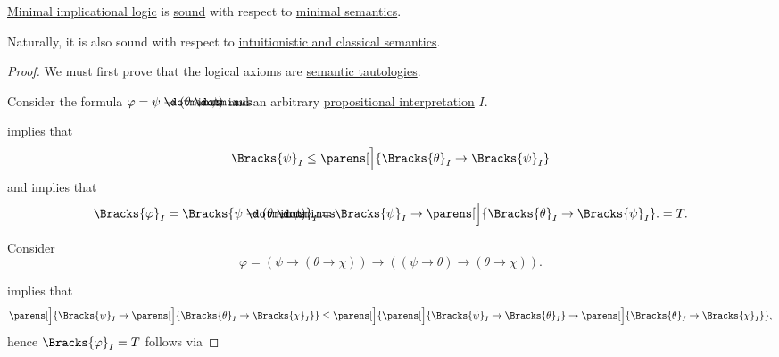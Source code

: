 \begin{theorem}\label{thm:implicational_logic_is_sound}
  \hyperref[def:minimal_implication_logic]{Minimal implicational logic} is \hyperref[def:logical_framework/soundness]{sound} with respect to \hyperref[def:minimal_propositional_semantics]{minimal semantics}.
\end{theorem}
\begin{comments}
  \item Naturally, it is also sound with respect to \hyperref[def:propositional_semantics]{intuitionistic and classical semantics}.
\end{comments}
\begin{proof}
   We must first prove that the logical axioms are \hyperref[def:propositional_tautology]{semantic tautologies}.

   Consider the formula \( \varphi = \psi \synimplies (\theta \synimplies \psi) \) and an arbitrary \hyperref[def:propositional_valuation]{propositional interpretation} \( I \).

   implies that
  \begin{equation*}
    \Bracks{\psi}_I \leq \parens[\Big]{ \Bracks{\theta}_I \rightarrow \Bracks{\psi}_I }
  \end{equation*}
  and  implies that
  \begin{equation*}
    \Bracks{\varphi}_I
    =
    \Bracks{\psi \synimplies (\theta \synimplies \psi)}_I
    =
    \Bracks{\psi}_I \rightarrow \parens[\Big]{ \Bracks{\theta}_I \rightarrow \Bracks{\psi}_I }.
    =
    T.
  \end{equation*}

   Consider
  \begin{equation*}
    \varphi = (\psi \rightarrow (\theta \rightarrow \chi)) \rightarrow ((\psi \rightarrow \theta) \rightarrow (\theta \rightarrow \chi)).
  \end{equation*}

   implies that
  \begin{equation*}
    \parens[\Big]{ \Bracks{\psi}_I \rightarrow \parens[\Big]{ \Bracks{\theta}_I \rightarrow \Bracks{\chi}_I } } \leq \parens[\Big]{ \parens[\Big]{ \Bracks{\psi}_I \rightarrow \Bracks{\theta}_I } \rightarrow \parens[\Big]{ \Bracks{\theta}_I \rightarrow \Bracks{\chi}_I } },
  \end{equation*}
  hence \( \Bracks{\varphi}_I = T \) follows via 


\end{proof}
